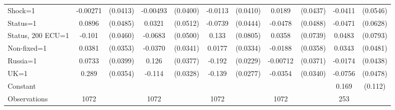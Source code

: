 \begin{tabular}{l|cccccccc|cc}
Shock=1         & -0.00271         & (0.0413)& -0.00493         & (0.0400)&  -0.0113         & (0.0410)&   0.0189         & (0.0437)&  -0.0411         & (0.0546)\\
Status=1        &   0.0896\sym{*}  & (0.0485)&   0.0321         & (0.0512)&  -0.0739\sym{*}  & (0.0444)&  -0.0478         & (0.0488)&  -0.0471         & (0.0628)\\
Status, 200 ECU=1&   -0.101\sym{**} & (0.0460)&  -0.0683         & (0.0500)&    0.133\sym{*}  & (0.0805)&   0.0358         & (0.0739)&   0.0483         & (0.0793)\\
Non-fixed=1     &   0.0381         & (0.0353)&  -0.0370         & (0.0341)&   0.0177         & (0.0334)&  -0.0188         & (0.0358)&   0.0343         & (0.0481)\\
Russia=1        &   0.0733\sym{*}  & (0.0399)&    0.126\sym{***}& (0.0377)&   -0.192\sym{***}& (0.0229)& -0.00712         & (0.0371)&  -0.0174         & (0.0438)\\
UK=1            &    0.289\sym{***}& (0.0354)&   -0.114\sym{***}& (0.0328)&   -0.139\sym{***}& (0.0277)&  -0.0354         & (0.0340)&  -0.0756         & (0.0478)\\
Constant        &                  &         &                  &         &                  &         &                  &         &    0.169         &  (0.112)\\
\hline
Observations    &     1072         &         &     1072         &         &     1072         &         &     1072         &         &      253         &         \\


\end{tabular}
